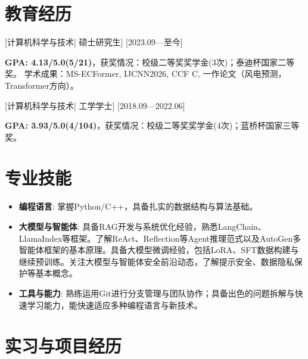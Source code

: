 \documentclass{resume}
\begin{document}


\ResumeTitle


\section{教育经历}
[\textnormal{计算机科学与技术|}  硕士研究生]
[2023.09—至今]

\textbf{GPA: 4.13/5.0(5/21)}，获奖情况：校级二等奖奖学金(3次)；泰迪杯国家二等奖。
学术成果：MS-ECFormer, IJCNN2026, CCF C, 一作论文（风电预测，Transformer方向）。

[\textnormal{计算机科学与技术|} 工学学士]
[2018.09—2022.06]

\textbf{GPA: 3.93/5.0(4/104)}，获奖情况：校级二等奖奖学金(4次)；蓝桥杯国家三等奖。

\section[专业技能]{专业技能}
\begin{itemize}
  \item \textbf{编程语言}: 掌握Python/C++，具备扎实的数据结构与算法基础。
  \item \textbf{大模型与智能体}: 具备RAG开发与系统优化经验，熟悉LangChain、LlamaIndex等框架。了解ReAct、Reflection等Agent推理范式以及AutoGen多智能体框架的基本原理。具备大模型微调经验，包括LoRA、SFT数据构建与继续预训练。关注大模型与智能体安全前沿动态，了解提示安全、数据隐私保护等基本概念。
  \item \textbf{工具与能力}: 熟练运用Git进行分支管理与团队协作；具备出色的问题拆解与快速学习能力，能快速适应多种编程语言与新技术。
\end{itemize}

\section{实习与项目经历}
\end{document}
